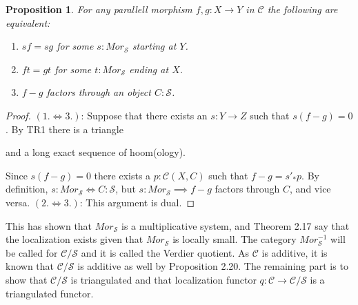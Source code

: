 \documentclass[11pt]{article}
\newtheorem{prop}[theorem]{Proposition}
\theoremstyle{definition}
\theoremstyle{remark}
\begin{document}
            \begin{prop}
                For any parallell morphism $f,g:X\rightarrow Y$ in $\mathcal{C}$ the following are equivalent:
                \begin{enumerate}
                    \item $sf=sg$ for some $s:Mor_\mathcal{S}$ starting at $Y$.
                    \item $ft=gt$ for some $t:Mor_\mathcal{S}$ ending at $X$.
                    \item $f-g$ factors through an object $C:\mathcal{S}$.
                \end{enumerate}
            \end{prop}

            \begin{proof}
                $(1.\iff 3.)$:
                Suppose that there exists an $s:Y\rightarrow Z$ such that $s(f-g)=0$. By TR1 there is a triangle  and a long exact sequence of hoom(ology).
                \begin{center}
                \end{center}
                Since $s(f-g)=0$ there exists a $p:\mathcal{C}(X,C)$ such that $f-g = s'_*p$. By definition, $s:Mor_\mathcal{S}\iff C:\mathcal{S}$, but $s:Mor_\mathcal{S}\implies f-g$ factors through $C$, and vice versa.
                $(2.\iff 3.)$:
                This argument is dual.
            \end{proof}

            This has shown that $Mor_\mathcal{S}$ is a multiplicative system, and Theorem 2.17 say that the localization exists given that $Mor_\mathcal{S}$ is locally small. The category $Mor_\mathcal{S}^{-1}$ will be called for $\mathcal{C}/\mathcal{S}$ and it is called the Verdier quotient. As $\mathcal{C}$ is additive, it is known that $\mathcal{C}/\mathcal{S}$ is additive as well by Proposition 2.20. The remaining part is to show that $\mathcal{C}/\mathcal{S}$ is triangulated and that localization functor $q:\mathcal{C}\rightarrow \mathcal{C}/\mathcal{S}$ is a triangulated functor.
\end{document}
